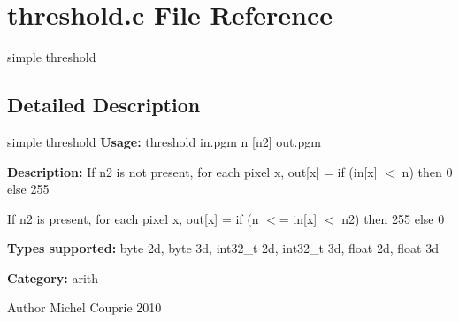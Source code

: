 \section{threshold.c File Reference}
\label{threshold_8c}


simple threshold  




\subsection{Detailed Description}
simple threshold {\bfseries Usage:} threshold in.pgm n [n2] out.pgm

{\bfseries Description:} If n2 is not present, for each pixel x, out[x] = if (in[x] $<$ n) then 0 else 255

If n2 is present, for each pixel x, out[x] = if (n $<$= in[x] $<$ n2) then 255 else 0

{\bfseries Types supported:} byte 2d, byte 3d, int32\_\-t 2d, int32\_\-t 3d, float 2d, float 3d

{\bfseries Category:} arith

\begin{DoxyAuthor}{Author}
Michel Couprie 2010 
\end{DoxyAuthor}
